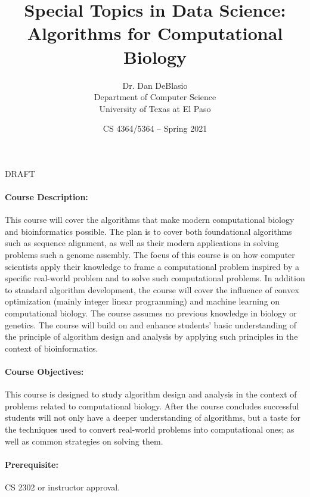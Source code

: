 \documentclass[12pt]{scrartcl}
\title{Special Topics in Data Science: 
Algorithms for Computational Biology}\let\Title\@title
\subtitle{
{\small
\vskip0.5cm
Dr. Dan DeBlasio\\
Department of Computer Science \\
University of Texas at El Paso}
\vskip-1cm}
\date{\small CS 4364/5364 -- Spring 2021}
\begin{document}

\maketitle

\begin{center}
{\Huge\color{red}DRAFT}
\end{center}
\paragraph{Course Description:} 
This course will cover the algorithms that make modern computational biology and bioinformatics possible. 
The plan is to cover both foundational algorithms such as sequence alignment, 
as well as their modern applications in solving problems such a genome assembly. 
The focus of this course is on how computer scientists apply their knowledge to frame a computational problem inspired by a specific real-world problem 
and to solve such computational problems. 
In addition to standard algorithm development, 
the course will cover the influence of convex optimization (mainly integer linear programming) and machine learning on computational biology. 
The course assumes no previous knowledge in biology or genetics. 
The course will build on and enhance students’ basic understanding of the principle of algorithm design and analysis by applying such principles in the context of bioinformatics.


\paragraph{Course Objectives:} This course is designed to study algorithm design and analysis in the context of problems related to computational biology. 
After the course concludes successful students will not only have a deeper understanding of algorithms, but a taste for the techniques used to convert real-world problems into computational ones;
as well as common strategies on solving them. 


\paragraph{Prerequisite:} CS 2302 or instructor approval. 
\end{document}
